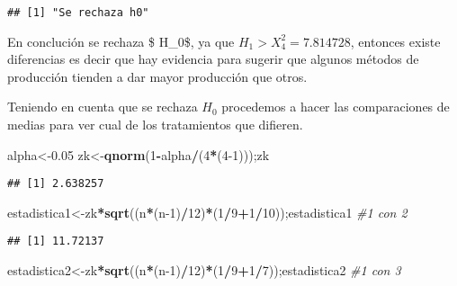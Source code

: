 \documentclass[
]{article}
\newenvironment{Shaded}{\begin{snugshade}}{\end{snugshade}}
\newcommand{\CommentTok}[1]{\textcolor[rgb]{0.56,0.35,0.01}{\textit{#1}}}
\newcommand{\DecValTok}[1]{\textcolor[rgb]{0.00,0.00,0.81}{#1}}
\newcommand{\FloatTok}[1]{\textcolor[rgb]{0.00,0.00,0.81}{#1}}
\newcommand{\FunctionTok}[1]{\textcolor[rgb]{0.13,0.29,0.53}{\textbf{#1}}}
\newcommand{\NormalTok}[1]{#1}
\newcommand{\OtherTok}[1]{\textcolor[rgb]{0.56,0.35,0.01}{#1}}
\newcommand{\SpecialCharTok}[1]{\textcolor[rgb]{0.81,0.36,0.00}{\textbf{#1}}}
\begin{document}
\begin{verbatim}
## [1] "Se rechaza h0"
\end{verbatim}

En conclución se rechaza \$ H\_0\$, ya que \(H_1 > X^{2}_{4}=7.814728\),
entonces existe diferencias es decir que hay evidencia para sugerir que
algunos métodos de producción tienden a dar mayor producción que otros.

Teniendo en cuenta que se rechaza \(H_0\) procedemos a hacer las
comparaciones de medias para ver cual de los tratamientos que difieren.

\begin{Shaded}
\begin{Highlighting}[]
\NormalTok{alpha}\OtherTok{\textless{}{-}}\FloatTok{0.05}
\NormalTok{zk}\OtherTok{\textless{}{-}}\FunctionTok{qnorm}\NormalTok{(}\DecValTok{1}\SpecialCharTok{{-}}\NormalTok{alpha}\SpecialCharTok{/}\NormalTok{(}\DecValTok{4}\SpecialCharTok{*}\NormalTok{(}\DecValTok{4{-}1}\NormalTok{)));zk}
\end{Highlighting}
\end{Shaded}

\begin{verbatim}
## [1] 2.638257
\end{verbatim}

\begin{Shaded}
\begin{Highlighting}[]
\NormalTok{estadistica1}\OtherTok{\textless{}{-}}\NormalTok{zk}\SpecialCharTok{*}\FunctionTok{sqrt}\NormalTok{((n}\SpecialCharTok{*}\NormalTok{(n}\DecValTok{{-}1}\NormalTok{)}\SpecialCharTok{/}\DecValTok{12}\NormalTok{)}\SpecialCharTok{*}\NormalTok{(}\DecValTok{1}\SpecialCharTok{/}\DecValTok{9}\SpecialCharTok{+}\DecValTok{1}\SpecialCharTok{/}\DecValTok{10}\NormalTok{));estadistica1 }\CommentTok{\#1 con 2}
\end{Highlighting}
\end{Shaded}

\begin{verbatim}
## [1] 11.72137
\end{verbatim}

\begin{Shaded}
\begin{Highlighting}[]
\NormalTok{estadistica2}\OtherTok{\textless{}{-}}\NormalTok{zk}\SpecialCharTok{*}\FunctionTok{sqrt}\NormalTok{((n}\SpecialCharTok{*}\NormalTok{(n}\DecValTok{{-}1}\NormalTok{)}\SpecialCharTok{/}\DecValTok{12}\NormalTok{)}\SpecialCharTok{*}\NormalTok{(}\DecValTok{1}\SpecialCharTok{/}\DecValTok{9}\SpecialCharTok{+}\DecValTok{1}\SpecialCharTok{/}\DecValTok{7}\NormalTok{));estadistica2  }\CommentTok{\#1 con 3}
\end{Highlighting}
\end{Shaded}
\end{document}
